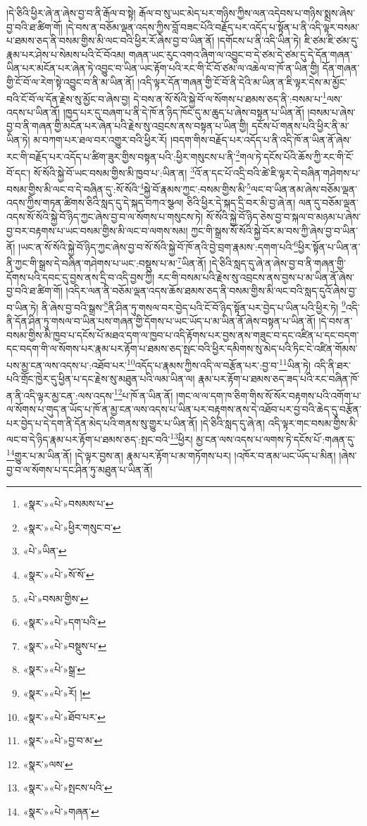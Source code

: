།དེ་ཅིའི་ཕྱིར་ཞེ་ན་ཞེས་བྱ་བ་ནི་རྒོལ་བ་སྟེ། རྒོལ་བ་སུ་ཡང་མེད་པར་གཉིས་ཀྱིས་ལན་འདེབས་པ་གཉིས་སྨྲས་ཞེས་བྱ་བའི་ཐ་ཚིག་གོ། །དེ་བས་ན་བཅོམ་ལྡན་འདས་ཀྱིས་བློ་བཟང་པོའི་བརྗོད་པར་འདོད་པ་སྟོན་པ་ནི་འདི་ལྟར་བསམ་པ་ཐམས་ཅད་ནི་བསམ་གྱིས་མི་ལང་བའི་ཕྱིར་རོ་ཞེས་བྱ་བ་ཡིན་ནོ། །དགོངས་པ་ནི་འདི་ཡིན་ཏེ། ཇི་ཙམ་ཇི་ཙམ་དུ་རྣམ་པར་ཤེས་པ་སེམས་པའི་ངོ་བོའམ། གཞན་ཡང་རུང་འགའ་ཞིག་ལ་འབྱུང་བ་དེ་ཙམ་དེ་ཙམ་དུ་དེ་དོན་གཞན་ཡིན་པར་མངོན་པར་ཞེན་ཏེ་འབྱུང་བ་ཡིན་ཡང་རྟོག་པའི་རང་གི་ངོ་བོ་ཙམ་ལ་འཆེལ་བ་ཁོ་ན་ཡིན་གྱི། དོན་གཞན་གྱི་ངོ་བོ་ལ་རེག་སྟེ་འབྱུང་བ་ནི་མ་ཡིན་ནོ། །འདི་ལྟར་དོན་གཞན་གྱི་ངོ་བོ་ནི་དེའི་མ་ཡིན་ན་ཇི་ལྟར་དེས་མ་མྱོང་བའི་ངོ་བོ་ལ་དོན་རྗེས་སུ་མྱོང་བ་ཞེས་བྱ། དེ་བས་ན་སོ་སོའི་སྐྱེ་བོ་ལ་སོགས་པ་ཐམས་ཅད་ནི་:བསམ་པ་\footnote{«སྣར་»«པེ་»བསམས་པ་}ལས་འདས་པ་ཡིན་ནོ། །ཁྱད་པར་དུ་བཞག་པ་ནི་དེ་ཁོ་ན་ཉིད་ཁོང་དུ་མ་ཆུད་པ་ཞེས་བསྟན་པ་ཡིན་ནོ། །བསམ་པ་ཞེས་བྱ་བ་ནི་གཞན་གྱི་མངོན་པར་ཞེན་པའི་རྗེས་སུ་འབྲངས་ནས་བསྟན་པ་ཡིན་གྱི། དངོས་པོ་གནས་པའི་ཕྱིར་ནི་མ་ཡིན་ཏེ། མ་བཀག་པར་ཐལ་བར་འགྱུར་བའི་ཕྱིར་རོ། །བདག་གིས་བརྗོད་པར་འདོད་པ་ནི་འདི་ཁོ་ན་ཡིན་ནོ་ཞེས་རང་གི་བརྗོད་པར་འདོད་པ་ཚིག་ཟུར་གྱིས་བསྟན་པའི་:ཕྱིར་གསུངས་པ་ནི་\footnote{«སྣར་»«པེ་»ཕྱིར་གསུང་བ་}གལ་ཏེ་དངོས་པོའི་ཆོས་ཀྱི་རང་གི་ངོ་བོ་དང་། སོ་སོའི་སྐྱེ་བོ་ཡང་བསམ་གྱིས་མི་ཁྱབ་པ་:ཡིན་ན། \footnote{«པེ་»ཡིན་}འོ་ན་དང་པོ་འདྲི་བའི་ཚེ་ཇི་ལྟར་དེ་བཞིན་གཤེགས་པ་བསམ་གྱིས་མི་ལང་བ་དེ་བཞིན་དུ་:སོ་སོའི་\footnote{«སྣར་»«པེ་»སོ་སོ་}སྐྱེ་བོ་རྣམས་ཀྱང་:བསམ་གྱིས་མི་\footnote{«པེ་»བསམ་གྱིས་}ལང་བ་ཡིན་ནམ་ཞེས་བཅོམ་ལྡན་འདས་ཀྱིས་གཏན་ཚིགས་ཅིའི་སླད་དུ་དེ་སྐད་བཀའ་སྩལ། ཅིའི་ཕྱིར་དེ་སྐད་དྲི་བར་མི་བྱ་ཞེ་ན། ལན་དུ་བཅོམ་ལྡན་འདས་སོ་སོའི་སྐྱེ་བོ་ཉིད་ཀྱང་ཞེས་བྱ་བ་ལ་སོགས་པ་གསུངས་ཏེ། སོ་སོའི་སྐྱེ་བོ་ཉིད་ཅེས་བྱ་བ་སྐལ་བ་མཉམ་པ་ཞེས་བྱ་བར་བརྟགས་པ་ཡང་བསམ་གྱིས་མི་ལང་བ་ལགས་སམ། ཀྱང་གི་སྒྲས་སོ་སོའི་སྐྱེ་བོར་མ་བས་ཀྱི་ཞེས་བྱ་བ་ཡིན་ནོ། །ཡང་ན་སོ་སོའི་སྐྱེ་བོ་ཉིད་ཀྱང་ཞེས་བྱ་བ་སོ་སོའི་སྐྱེ་བོ་ཁོ་ནའི་བྱེ་བྲག་རྣམས་:དགག་པའི་\footnote{«སྣར་»«པེ་»དག་པའི་}ཕྱིར་སྟོན་པ་ཡིན་ན་ནི་ཀྱང་གི་སྒྲས་དེ་བཞིན་གཤེགས་པ་ཡང་:བསྡུས་པ་མ་\footnote{«སྣར་»«པེ་»བསྡུས་པ་}ཡིན་ནོ། །དེ་ཅིའི་སླད་དུ་ཞེ་ན་ཞེས་བྱ་བ་ནི་གཞན་གྱི་དོགས་པའི་དབང་དུ་བྱས་ནས་དྲི་བ་འདི་བྱས་ཀྱི། རང་གི་བསམ་པའི་རྗེས་སུ་འབྲངས་ནས་བྱས་པ་མ་ཡིན་ནོ་ཞེས་བྱ་བའི་ཐ་ཚིག་གོ། །འདིར་ལན་ནི་བཅོམ་ལྡན་འདས་ཆོས་ཐམས་ཅད་ནི་བསམ་གྱིས་མི་ལང་བའི་སླད་དུའོ་ཞེས་བྱ་བ་ཡིན་ཏེ། ནི་ཞེས་བྱ་བའི་སྒྲས་\footnote{«སྣར་»«པེ་»སྒྲ་}ནི་ཤིན་ཏུ་གསལ་བར་བྱེད་པའི་ངོ་བོ་ཉིད་སྟོན་པར་བྱེད་པ་ཡིན་པའི་ཕྱིར་ཏེ། \footnote{«སྣར་»«པེ་»རོ། ། }འདི་ནི་དོན་ཤིན་ཏུ་གསལ་བ་ཡིན་པས་གཞན་གྱི་དོགས་པ་ཡང་ཡོད་པ་མ་ཡིན་ནོ་ཞེས་བསྟན་པ་ཡིན་ནོ། །དེ་བས་ན་བསམ་གྱིས་མི་ཁྱབ་པ་དངོས་པོ་མཐའ་དག་ལ་ཁྱབ་པ་འདི་རྟོགས་པར་བྱས་ནས་གཟུང་བ་དང་འཛིན་པ་དང་བདག་དང་བདག་གི་ལ་སོགས་པར་རྣམ་པར་རྟོག་པ་ཐམས་ཅད་སྤང་བའི་ཕྱིར་དམིགས་སུ་མེད་པའི་ཏིང་ངེ་འཛིན་གོམས་པས་མྱ་ངན་ལས་འདས་པ་:འཐོབ་པར་\footnote{«སྣར་»«པེ་»ཐོབ་པར་}འདོད་པ་རྣམས་ཀྱིས་འདི་ལ་བརྩོན་པར་:བྱ་བ་\footnote{«སྣར་»«པེ་»བྱ་བ་མ་}ཡིན་ཏེ། འདི་ནི་ཐར་པའི་གྲོང་ཁྱེར་དུ་ཕྱིན་པ་དང་རྗེས་སུ་མཐུན་པའི་ལམ་ཡིན་ལ། རྣམ་པར་རྟོག་པ་ཐམས་ཅད་ཟད་པའི་རང་བཞིན་ཁོ་ན་ནི་འདི་ལྟར་མྱ་ངན་:ལས་འདས་\footnote{«སྣར་»ལས་}པ་ཁོ་ན་ཡིན་ནོ། །གང་ལ་ལ་དག་ཁ་ཅིག་གིས་སོ་སོར་བརྟགས་པའི་འགོག་པ་ལ་སོགས་པ་གུད་ན་ཡོད་པ་ཁོ་ན་མྱ་ངན་ལས་འདས་པ་ཡིན་པར་བརྟགས་ནས་དེ་འཐོབ་པར་བྱ་བའི་ཆེད་དུ་བརྩོན་པར་བྱེད་པ་དེ་དག་ནི་དོན་མེད་པའི་གནས་སུ་གྱུར་པ་ཡིན་ནོ། །དེ་ཅིའི་སླད་དུ་ཞེ་ན། འདི་ལྟར་གང་བསམ་གྱིས་མི་ལང་བ་དེ་ཉིད་རྣམ་པར་རྟོག་པ་ཐམས་ཅད་:སྤང་བའི་\footnote{«སྣར་»«པེ་»སྤངས་པའི་}ཕྱིར། མྱ་ངན་ལས་འདས་པ་ལགས་ཏེ་དངོས་པོ་:གཞན་དུ་\footnote{«སྣར་»«པེ་»གཞན་}གྱུར་པ་མ་ཡིན་ནོ། །དེ་ལྟར་བྱས་ན། རྣམ་པར་རྟོག་པ་མ་གཏོགས་པར། །འཁོར་བ་ནམ་ཡང་ཡོད་པ་མིན། །ཞེས་བྱ་བ་ལ་སོགས་པ་དང་ཤིན་ཏུ་མཐུན་པ་ཡིན་ནོ། 